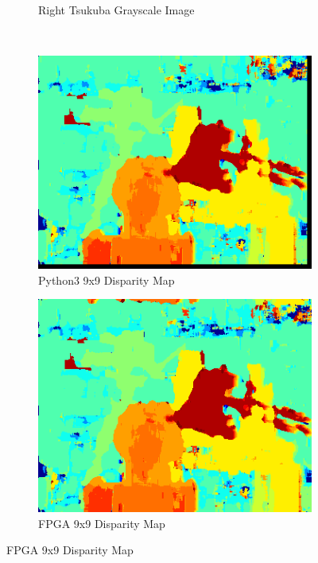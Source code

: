\begin{figure}
\begin{center}
\begin{subfigure}{0.45\textwidth}
		\caption{Right Tsukuba Grayscale Image}
		\label{fig:tsukubaR}
	\end{subfigure}
	\\
	\begin{subfigure}{0.45\textwidth}
		\includegraphics[width=\textwidth]{figures/tsukuba_9x9_python3.png}
		\caption{Python3 9x9 Disparity Map}
		\label{fig:tsukubaPy}
	\end{subfigure}
	\begin{subfigure}{0.45\textwidth}
		\includegraphics[width=\textwidth]{figures/tsukuba_9x9_fpga.png}
		\caption{FPGA 9x9 Disparity Map}
		\label{fig:tsukubaFPGA}
	\end{subfigure}

\end{center}
\end{figure}
